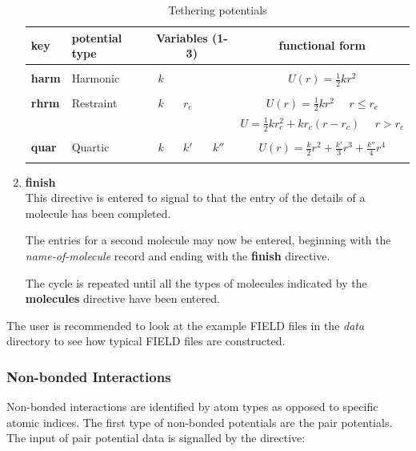\begin{enumerate}
\begin{table}[ht]
\caption{\label{tethtable} Tethering potentials}     
\vskip 5pt
\begin{centering}
 \begin{tabular}{|l|l|c|c|c|c|}
\hline
key & potential type &
\multicolumn{3}{c|}{Variables (1-3)} & functional form\\
\hline
 & & & & & \\
{\bf harm} & Harmonic & $k$ &  &  &$ U(r)=\frac{1}{2}kr^2$ \\
 & & & & & \\
{\bf rhrm} & Restraint & $k$ & $r_{c}$ & &
$U(r)=\frac{1}{2}kr^2~~~~~~r \le r_{c}$\\
  &  &  &  &  & $U=\frac{1}{2}kr_{c}^2+kr_{c}(r-r_{c})~~~~~~r>r_{c}$\\
 & & & & & \\
{\bf quar} & Quartic & $k$ & $k'$ & $k''$ & $U(r)=\frac{k}{2}r^2+
\frac{k'}{3}r^3+\frac{k''}{4}r^4$\\
 & & & & & \\
\hline
\end{tabular}

\end{centering}

\end{table}

\item {\bf finish}\\
This directive is entered to signal to \D{} that the entry of the
details of a molecule has been completed.

The entries for a second molecule may now be entered, beginning with
the {\em name-of-molecule} record and ending with the {\bf finish}
directive.

The cycle is repeated until all the types of molecules indicated by
the {\bf molecules} directive have been entered.

\end{enumerate}

The user is recommended to look at the example FIELD files in the {\em
data} directory to see how typical FIELD files are constructed.


\subsubsection{Non-bonded Interactions}

Non-bonded interactions are identified by atom types as opposed to
specific atomic indices. The first type of
non-bonded potentials are the pair
potentials. The input of pair potential data is signalled by the
directive:

